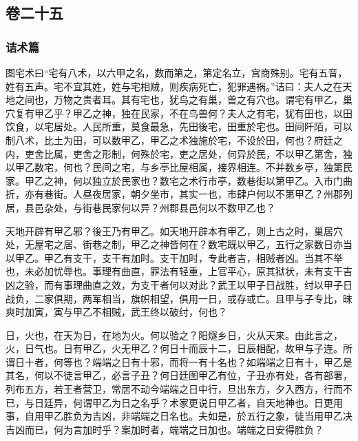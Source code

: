 \documentclass[]{article}
\begin{document}
\hypertarget{header-n855}{%
\subsection{卷二十五}\label{header-n855}}

\hypertarget{header-n856}{%
\subsubsection{诘术篇}\label{header-n856}}

图宅术曰``宅有八术，以六甲之名，数而第之，第定名立，宫商殊别。宅有五音，姓有五声。宅不宜其姓，姓与宅相贼，则疾病死亡，犯罪遇祸。''诘曰：夫人之在天地之间也，万物之贵者耳。其有宅也，犹鸟之有巢，兽之有穴也。谓宅有甲乙，巢穴复有甲乙乎？甲乙之神，独在民家，不在鸟兽何？夫人之有宅，犹有田也，以田饮食，以宅居处。人民所重，莫食最急，先田後宅，田重於宅也。田间阡陌，可以制八术，比土为田，可以数甲乙，甲乙之术独施於宅，不设於田，何也？府廷之内，吏舍比属，吏舍之形制，何殊於宅，吏之居处，何异於民，不以甲乙第舍，独以甲乙数宅，何也？民间之宅，与乡亭比屋相属，接界相连。不并数乡亭，独第民家。甲乙之神，何以独立於民家也？数宅之术行市亭，数巷街以第甲乙。入市门曲折，亦有巷街。人昼夜居家，朝夕坐市，其实一也，市肆户何以不第甲乙？州郡列居，县邑杂处，与街巷民家何以异？州郡县邑何以不数甲乙也？

天地开辟有甲乙邪？後王乃有甲乙。如天地开辟本有甲乙，则上古之时，巢居穴处，无屋宅之居、街巷之制，甲乙之神皆何在？数宅既以甲乙，五行之家数日亦当以甲乙。甲乙有支干，支干有加时。支干加时，专此者吉，相贼者凶。当其不举也，未必加忧辱也。事理有曲直，罪法有轻重，上官平心，原其狱状，未有支干吉凶之验，而有事理曲直之效，为支干者何以对此？武王以甲子日战胜，纣以甲子日战负，二家俱期，两军相当，旗帜相望，俱用一日，或存或亡。且甲与子专比，昧爽时加寅，寅与甲乙不相贼，武王终以破纣，何也？

日，火也，在天为日，在地为火。何以验之？阳燧乡日，火从天来。由此言之，火，日气也。日有甲乙，火无甲乙？何日十而辰十二，日辰相配，故甲与子连。所谓日十者，何等也？端端之日有十邪，而将一有十名也？如端端之日有十，甲乙是其名，何以不徒言甲乙，必言子丑？何日廷图甲乙有位，子丑亦有处，各有部署，列布五方，若王者营卫，常居不动今端端之日中行，旦出东方，夕入西方，行而不已，与日廷异，何谓甲乙为日之名乎？术家更说日甲乙者，自天地神也。日更用事，自用甲乙胜负为吉凶，非端端之日名也。夫如是，於五行之象，徒当用甲乙决吉凶而已，何为言加时乎？案加时者，端端之日加也。端端之日安得胜负？
\end{document}
